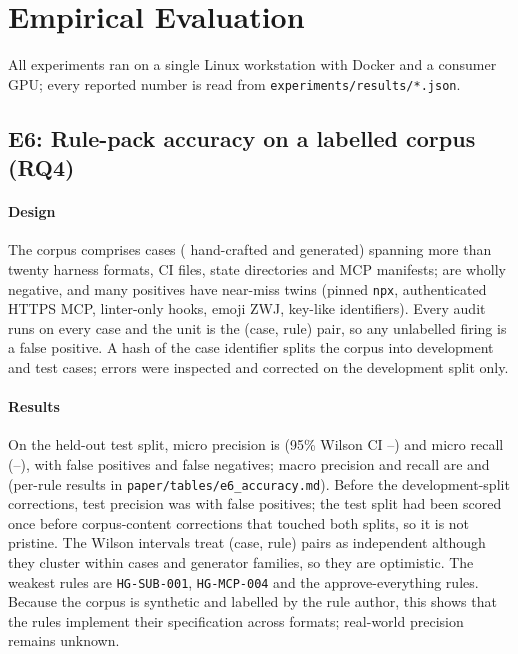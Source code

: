 \section{Empirical Evaluation}\label{sec:eval}

All experiments ran on a single Linux workstation with Docker and a consumer GPU; every reported number is read from \texttt{experiments/results/*.json}.

\subsection{E6: Rule-pack accuracy on a labelled corpus (RQ4)}\label{sec:eval-e6}
\paragraph*{Design} The corpus comprises \nESixCases{} cases (\nESixHand{} hand-crafted and \nESixGenerated{} generated) spanning more than twenty harness formats, CI files, state directories and MCP manifests; \nESixNegative{} are wholly negative, and many positives have near-miss twins (pinned \texttt{npx}, authenticated HTTPS MCP, linter-only hooks, emoji ZWJ, key-like identifiers). Every audit runs on every case and the unit is the (case, rule) pair, so any unlabelled firing is a false positive. A hash of the case identifier splits the corpus into \nESixDev{} development and \nESixTest{} test cases; errors were inspected and corrected on the development split only.

\paragraph*{Results} On the held-out test split, micro precision is \eSixPrecision{} (95\% Wilson CI \eSixPrecisionLo--\eSixPrecisionHi) and micro recall \eSixRecall{} (\eSixRecallLo--\eSixRecallHi), with \eSixFP{} false positives and \eSixFN{} false negatives; macro precision and recall are \eSixMacroPrecision{} and \eSixMacroRecall{} (per-rule results in \texttt{paper/tables/e6\_accuracy.md}). Before the development-split corrections, test precision was \eSixPrecisionBefore{} with \eSixFPBefore{} false positives; the test split had been scored once before corpus-content corrections that touched both splits, so it is not pristine. The Wilson intervals treat (case, rule) pairs as independent although they cluster within cases and generator families, so they are optimistic. The weakest rules are \texttt{HG-SUB-001}, \texttt{HG-MCP-004} and the approve-everything rules. Because the corpus is synthetic and labelled by the rule author, this shows that the rules implement their specification across formats; real-world precision remains unknown.


